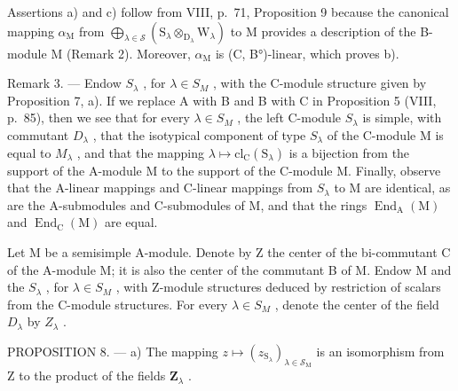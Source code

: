 Assertions a) and c) follow from VIII, p.~71, Proposition 9 because the canonical mapping \(\alpha_{\mathrm{M}}\) from \(\bigoplus_{\lambda \in \mathcal{S}} (\mathrm{S}_{\lambda} \otimes_{\mathrm{D}_{\lambda}} \mathrm{W}_{\lambda})\) to M provides a description of the B-module M (Remark 2). Moreover, \(\alpha_{\mathrm{M}}\) is (C, B°)-linear, which proves b).

Remark 3. --- Endow \(S_{\lambda}\) , for \(\lambda \in S_{M}\) , with the C-module structure given by Proposition 7, a). If we replace A with B and B with C in Proposition 5 (VIII, p.~85), then we see that for every \(\lambda \in S_{M}\) , the left C-module \(S_{\lambda}\) is simple, with commutant \(D_{\lambda}\) , that the isotypical component of type \(S_{\lambda}\) of the C-module M is equal to \(M_{\lambda}\) , and that the mapping \(\lambda \mapsto \mathrm{cl}_{\mathrm{C}}(\mathrm{S}_{\lambda})\) is a bijection from the support of the A-module M to the support of the C-module M. Finally, observe that the A-linear mappings and C-linear mappings from \(S_{\lambda}\) to M are identical, as are the A-submodules and C-submodules of M, and that the rings \(\operatorname{End}_{\mathrm{A}}(\mathrm{M})\) and \(\operatorname{End}_{\mathrm{C}}(\mathrm{M})\) are equal.

Let M be a semisimple A-module. Denote by Z the center of the bi-commutant C of the A-module M; it is also the center of the commutant B of M. Endow M and the \(S_{\lambda}\) , for \(\lambda \in S_{M}\) , with Z-module structures deduced by restriction of scalars from the C-module structures. For every \(\lambda \in S_{M}\) , denote the center of the field \(D_{\lambda}\) by \(Z_{\lambda}\) .

PROPOSITION 8. --- a) The mapping \(z \mapsto (z_{\mathrm{S}_{\lambda}})_{\lambda \in \mathcal{S}_{\mathrm{M}}}\) is an isomorphism from Z to the product of the fields \(\mathbf{Z}_{\lambda}\) .

